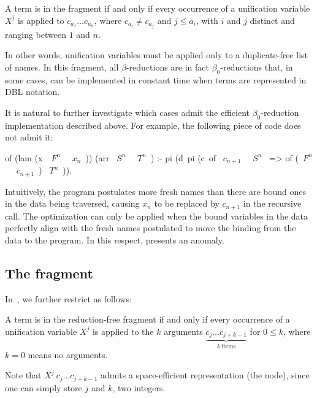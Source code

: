 \documentclass[a4paper, 11pt]{book}
\begin{document}
\begin{definition}
A term is in the \theotherfragment fragment if and only if every occurrence of
a unification variable $X^j$ is applied to $c_{a_1} \ldots c_{a_n}$, where
$c_{a_i} \neq c_{a_j}$ and $j \leq a_i$, with $i$ and $j$
distinct and ranging between $1$ and $n$.
\end{definition}

\noindent
In other words, unification variables must be applied only to a duplicate-free
list of names. In this fragment, all $\beta$-reductions are in fact
$\beta_0$-reductions that, in some cases, can be implemented in constant time
when terms are represented in DBL notation.


It is natural to further investigate which cases admit the efficient
$\beta_0$-reduction implementation described above. For example, the following
piece of code does not admit it:

\begin{elpicode}
of (lam (x\ ~$F^n$~ ~$x_n$~)) (arr ~$S^n$~ ~$T^n$~) :-
  pi (d\ pi (c\ of ~$c_{n+1}$~ ~$S^n$~ => of (~$F^n$~ ~$c_{n+1}$~) ~$T^n$~)).
\end{elpicode}

\noindent

Intuitively, the program postulates more fresh names than there are bound ones
in the data being traversed, causing $x_n$ to be replaced by $c_{n+1}$ in the
recursive call. The optimization can only be applied when the bound variables
in the data perfectly align with the fresh names postulated to move the binding
from the data to the program. In this respect, 
presents an anomaly.

\subsection{The \thefragment fragment}\label{sec:llambo}


In~\cite{dunchev15lpar}, we further restrict \theotherfragment as follows:


\begin{definition}
A term is in the reduction-free fragment \thefragment if and only if every
occurrence of a unification variable $X^j$ is applied to the $k$ arguments
$\underbrace{c_j \ldots c_{j + k-1}}_{k~\mathrm{items}}$ for $0 \leq k$,
where $k=0$ means no arguments.
\end{definition}


Note that $X^j\ c_j \ldots c_{j + k-1}$ admits a space-efficient
representation (the  node), since one can simply store $j$ and
$k$, two integers.
\end{document}
